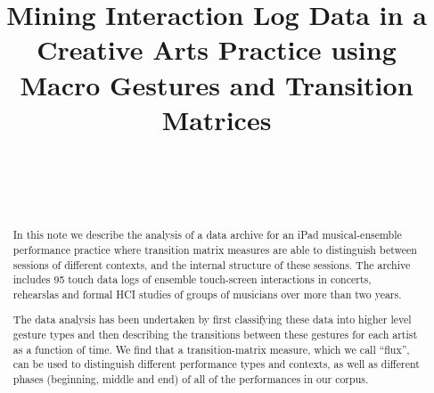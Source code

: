 \documentclass{sigchi}
\begin{document}
 
\title{Mining Interaction Log Data in a Creative Arts Practice using Macro Gestures and Transition Matrices}



\author{%
  \\
  \\
  \\
}

\maketitle

\begin{abstract}



  
  In this note we describe the analysis of a data archive for an iPad
  musical-ensemble performance practice where transition matrix
  measures are able to distinguish between sessions of different
  contexts, and the internal structure of these sessions. The archive
  includes 95 touch data logs of ensemble touch-screen interactions in
  concerts, rehearslas and formal HCI studies of groups of musicians
  over more than two years.



  The data analysis has been undertaken by first classifying
  these data into higher level gesture types and then describing the
  transitions between these gestures for each artist as a function of
  time. We find that a transition-matrix measure, which we call
  ``flux'', can be used to distinguish different performance types and
  contexts, as well as different phases (beginning, middle and end) of
  all of the performances in our corpus.

\end{abstract}
\end{document}
